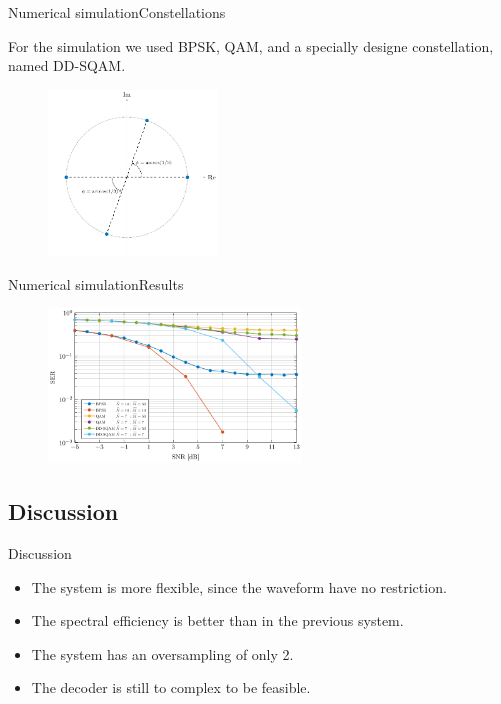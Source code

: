 \documentclass[en]{sdqbeamer}
\begin{document}
\begin{frame}{Numerical simulation}{Constellations}

For the simulation we used BPSK, QAM, and a specially designe constellation, named DD-SQAM.

\begin{figure}[!ht]
\begin{center}
\includegraphics[width=0.4\textwidth]{DD_SQAM_constellation.pdf}
\end{center}
\end{figure}


\end{frame}

\begin{frame}{Numerical simulation}{Results}
\begin{figure}[!ht]
\begin{center}
\includegraphics[width=0.6\textwidth]{Plabst_result_SER.pdf}
\end{center}
\end{figure}

\end{frame}


\subsection{Discussion}

\begin{frame}{Discussion}

\begin{itemize}
\item The system is more flexible, since the waveform have no restriction.
\item The spectral efficiency is better than in the previous system.
\item The system has an oversampling of only 2.
\item The decoder is still to complex to be feasible.
\end{itemize}


\end{frame}
\end{document}
